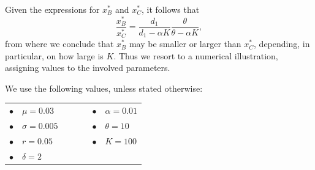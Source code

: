 
Given the expressions for $x^*_B$ and $x^*_C$, it follows that
$$ \frac{x^*_B}{x^*_C}=\frac{d_1}{d_1-\alpha K} \frac{\theta}{\theta-\alpha K},$$
from where we conclude that $x^*_B$ may be smaller or larger than $x^*_C$, depending, in particular, on how large is $K$. Thus we resort to a numerical illustration, assigning values to the involved parameters.

We use the following values, unless stated otherwise:

\begin{table}[!htb]
	\centering
	\begin{tabular}{lllllll}
		 $\bullet$ & $\mu=0.03$     &  & \hspace{7cm} &  &  $\bullet$ & $\alpha=0.01$ \\
		 $\bullet$ & $\sigma=0.005$ &  & \hspace{7cm} &  &  $\bullet$ & $\theta=10$   \\
		 $\bullet$ & $r=0.05$       &  & \hspace{7cm} &  &  $\bullet$ & $K=100$       \\
		 $\bullet$ & $\delta=2$                                
	\end{tabular}
\end{table}	

